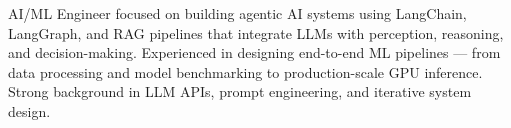 
AI/ML Engineer focused on building agentic AI systems using LangChain, LangGraph, and RAG pipelines that integrate LLMs with perception, reasoning, and decision-making. Experienced in designing end-to-end ML pipelines — from data processing and model benchmarking to production-scale GPU inference. Strong background in LLM APIs, prompt engineering, and iterative system design.

